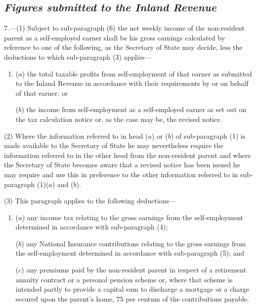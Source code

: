 \documentclass[12pt,a4paper]{article}
\begin{document}
\renewcommand\parthead{--- Schedule Part III}

\subsection*{\itshape Figures submitted to the Inland Revenue}

7.---(1)  Subject to sub-paragraph (6) the net weekly income of the non-resident parent as a self-employed earner shall be his gross earnings calculated by reference to one of the following, as the Secretary of State may decide, less the deductions to which sub-paragraph (3) applies—
\begin{enumerate}\item[]
($a$) the total taxable profits from self-employment of that earner as submitted to the Inland Revenue in accordance with their requirements by or on behalf of that earner; or

($b$) the income from self-employment as a self-employed earner as set out on the tax calculation notice or, as the case may be, the revised notice.
\end{enumerate}

(2) Where the information referred to in head ($a$)  or ($b$)  of sub-paragraph (1) is made available to the Secretary of State he may nevertheless require the information referred to in the other head from the non-resident parent and where the Secretary of State becomes aware that a revised notice has been issued he may require and use this in preference to the other information referred to in sub-paragraph (1)($a$)  and ($b$).

(3) This paragraph applies to the following deductions—
\begin{enumerate}\item[]
($a$) any income tax relating to the gross earnings from the self-employment determined in accordance with sub-paragraph (4);

($b$) any National Insurance contributions relating to the gross earnings from the self-employment determined in accordance with sub-paragraph (5); and

($c$) any premiums paid by the non-resident parent in respect of a retirement annuity contract or a personal pension scheme or, where that scheme is intended partly to provide a capital sum to discharge a mortgage or a charge secured upon the parent’s home, 75 per centum of the contributions payable.
\end{enumerate}
\end{document}
